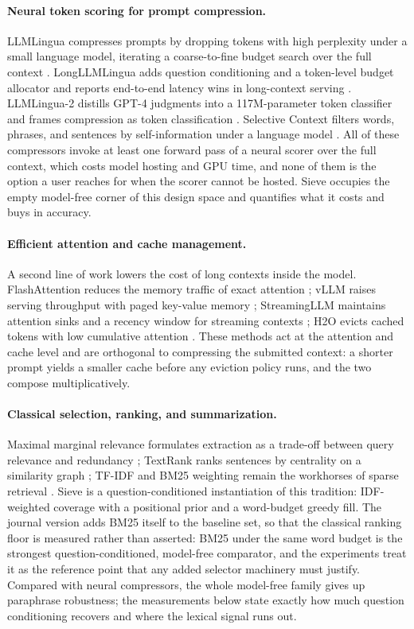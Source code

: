 \documentclass[review,12pt]{elsarticle}
\theoremstyle{remark}
\newcommand{\method}{Sieve}
\begin{document}
\paragraph{Neural token scoring for prompt compression.}
LLMLingua compresses prompts by dropping tokens with high perplexity
under a small language model, iterating a coarse-to-fine budget search
over the full context \citep{jiang2023llmlingua}. LongLLMLingua adds
question conditioning and a token-level budget allocator and reports
end-to-end latency wins in long-context serving
\citep{jiang2023longllmlingua}. LLMLingua-2 distills GPT-4 judgments
into a 117M-parameter token classifier and frames compression as token
classification \citep{pan2024llmlingua2}. Selective Context filters
words, phrases, and sentences by self-information under a language
model \citep{li2023selective}. All of these compressors invoke at
least one forward pass of a neural scorer over the full context, which
costs model hosting and GPU time, and none of them is the option a
user reaches for when the scorer cannot be hosted. \method{} occupies
the empty model-free corner of this design space and quantifies what
it costs and buys in accuracy.

\paragraph{Efficient attention and cache management.}
A second line of work lowers the cost of long contexts inside the
model. FlashAttention reduces the memory traffic of exact attention
\citep{dao2022flashattention}; vLLM raises serving throughput with
paged key-value memory \citep{kwon2023vllm}; StreamingLLM maintains
attention sinks and a recency window for streaming contexts
\citep{xiao2023streaming}; H2O evicts cached tokens with low
cumulative attention \citep{zhang2023h2o}. These methods act at the
attention and cache level and are orthogonal to compressing the
submitted context: a shorter prompt yields a smaller cache before any
eviction policy runs, and the two compose multiplicatively.

\paragraph{Classical selection, ranking, and summarization.}
Maximal marginal relevance formulates extraction as a trade-off
between query relevance and redundancy \citep{carbonell1998mmr};
TextRank ranks sentences by centrality on a similarity graph
\citep{mihalcea2004textrank}; TF-IDF and BM25 weighting remain the
workhorses of sparse retrieval \citep{robertson2009bm25}. \method{} is
a question-conditioned instantiation of this tradition: IDF-weighted
coverage with a positional prior and a word-budget greedy fill. The
journal version adds BM25 itself to the baseline set, so that the
classical ranking floor is measured rather than asserted: BM25 under
the same word budget is the strongest question-conditioned,
model-free comparator, and the experiments treat it as the reference
point that any added selector machinery must justify. Compared with
neural compressors, the whole model-free family gives up paraphrase
robustness; the measurements below state exactly how much question
conditioning recovers and where the lexical signal runs out.
\end{document}
